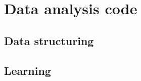 \documentclass[11pt]{report}
\begin{document}


%
%
%
%
%
%


\chapter{Data analysis code}

\section{Data structuring}

\section{Learning}
\end{document}
